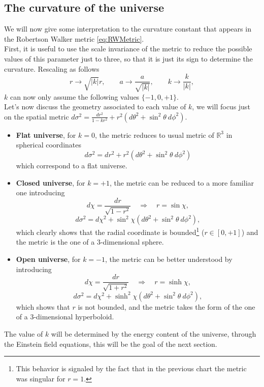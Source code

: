 \subsection{The curvature of the universe}
We will now give some interpretation to the curvature constant that appears in the Robertson Walker metric \eqref{eq:RWMetric}.\\First, it is useful to use the scale invariance of the metric to reduce the possible values of this parameter just to three, so that it is just its sign to determine the curvature. Rescaling as follows 
\begin{equation*}
    r\rightarrow\sqrt{|k|}r,\qquad a\rightarrow\frac{a}{\sqrt{|k|}},\qquad k\rightarrow\frac{k}{|k|},
\end{equation*}  
$k$ can now only assume the following values $\{-1,0,+1\}$. \\
Let's now discuss the geometry associated to each value of $k$, we will focus just on the spatial metric $d\sigma^2=\frac{dr^2}{1-kr^2}+r^2(d\theta^2+\sin^2\theta\ d\phi^2)$.
\begin{itemize}
    \item \textbf{Flat universe}, for $k=0$, the metric reduces to usual metric of $\mathbb{R}^3$ in spherical coordinates $$d\sigma^2= dr^2+r^2(d\theta^2+\sin^2\theta\ d\phi^2)$$ which correspond to a flat universe.
    \item \textbf{Closed universe}, for $k=+1$, the metric can be reduced to a more familiar one introducing $$d\chi=\frac{dr}{\sqrt{1-r^2}}\quad\Rightarrow\quad r=\sin\chi,$$$$d\sigma^2=d\chi^2+\sin^2\chi(d\theta^2+\sin^2\theta\ d\phi^2),$$which clearly shows that the radial coordinate is bounded\footnote{This behavior is signaled by the fact that in the previous chart the metric was singular for $r=1$.} ($r\in[0,+1]$) and the metric is the one of a $3$-dimensional sphere.
    \item \textbf{Open universe}, for $k=-1$, the metric can be better understood by introducing$$d\chi=\frac{dr}{\sqrt{1+r^2}}\quad\Rightarrow\quad r=\sinh\chi,$$$$d\sigma^2=d\chi^2+\sinh^2\chi(d\theta^2+\sin^2\theta\ d\phi^2),$$ which shows that $r$ is not bounded, and the metric takes the form of the one of a $3$-dimensional hyperboloid.
\end{itemize}
The value of $k$ will be determined by the energy content of the universe, through the Einstein field equations, this will be the goal of the next section.
